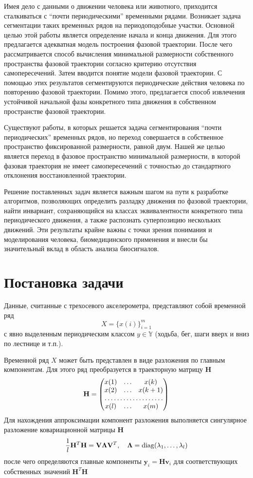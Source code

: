 \documentclass[12pt, twoside]{article}
\begin{document}
Имея дело с данными о движении человека или животного, приходится сталкиваться с “почти периодическими” временными рядами. Возникает задача сегментации таких временных рядов на периодоподобные участки. Основной целью этой работы является определение начала и конца движения. Для этого предлагается адекватная модель построения фазовой траектории. После чего рассматривается способ вычисления минимальной размерности собственного пространства фазовой траектории согласно критерию отсутствия самопересечений. Затем вводится понятие модели фазовой траектории. С помощью этих результатов сегментируются периодические действия человека по повторению фазовой траектории. Помимо этого, предлагается способ извлечения устойчивой начальной фазы конкретного типа движения в собственном пространстве фазовой траектории.

Существуют работы, в которых решается задача сегментирования “почти периодических” временных рядов, но переход совершается в собственное пространство фиксированной размерности, равной двум. Нашей же целью является переход в фазовое пространство минимальной размерности, в которой фазовая траектория не имеет самопересечений с точностью до стандартного отклонения восстановленной траектории.

Решение поставленных задач является важным шагом на пути к разработке алгоритмов, позволяющих определить разладку движения по фазовой траектории, найти инвариант, сохраняющийся на классах эквивалентности конкретного типа периодического движения, а также распознать суперпозицию нескольких движений. Эти результаты крайне важны с точки зрения понимания и моделирования человека, биомедицинского применения и внесли бы значительный вклад в область анализа биосигналов.

\section{Постановка задачи}
Данные, считанные с трехосевого акселерометра, представляют собой временной ряд 
    \[X = \{ x(i) \}_{i = 1}^{m} \] 
с явно выделенным периодическим классом $y\in\mathbb{Y}$ (ходьба, бег, шаги вверх и вниз по лестнице и т.п.).

Временной ряд $X$ может быть представлен в виде разложения по главным компонентам. Для этого ряд преобразуется в траекторную матрицу $\mathbf{H}$
    \[ \mathbf{H} = \begin{pmatrix}
                        x(1) & \dots & x(k) \\
                        x(2) & \dots & x(k+1) \\
                        \hdotsfor{3} \\
                        x(l) & \dots & x(m)
                    \end{pmatrix}\]
Для нахождения аппроксимации компонент разложения выполняется сингулярное разложение ковариационной матрицы $\mathbf{H}$
    \[ \frac{1}{l}\mathbf{H}^T\mathbf{H} = \mathbf{V}\mathbf{\Lambda}\mathbf{V}^T, \quad \mathbf{\Lambda} = \diag(\lambda_1,\dots,\lambda_l) \]
после чего определяются главные компоненты $\mathbf{y}_i = \mathbf{Hv}_i$ для соответствующих собственных значений $\mathbf{H}^T\mathbf{H}$
\end{document}
